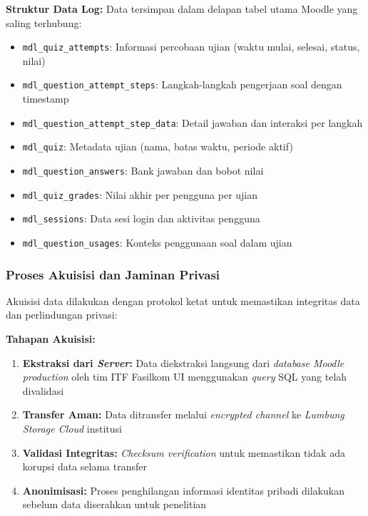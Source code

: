 \textbf{Struktur Data Log:}
Data tersimpan dalam delapan tabel utama Moodle yang saling terhubung:
\begin{itemize}
    \item \texttt{mdl\_quiz\_attempts}: Informasi percobaan ujian (waktu mulai, selesai, status, nilai)
    \item \texttt{mdl\_question\_attempt\_steps}: Langkah-langkah pengerjaan soal dengan timestamp
    \item \texttt{mdl\_question\_attempt\_step\_data}: Detail jawaban dan interaksi per langkah
    \item \texttt{mdl\_quiz}: Metadata ujian (nama, batas waktu, periode aktif)
    \item \texttt{mdl\_question\_answers}: Bank jawaban dan bobot nilai
    \item \texttt{mdl\_quiz\_grades}: Nilai akhir per pengguna per ujian
    \item \texttt{mdl\_sessions}: Data sesi login dan aktivitas pengguna
    \item \texttt{mdl\_question\_usages}: Konteks penggunaan soal dalam ujian
\end{itemize}

\subsubsection{Proses Akuisisi dan Jaminan Privasi}
\label{sec:prosesAkuisisiPrivasi}

Akuisisi data dilakukan dengan protokol ketat untuk memastikan integritas data dan perlindungan privasi:

\textbf{Tahapan Akuisisi:}
\begin{enumerate}
    \item \textbf{Ekstraksi dari \textit{Server}:} Data diekstraksi langsung dari \textit{database Moodle production} oleh tim ITF Fasilkom UI menggunakan \textit{query} SQL yang telah divalidasi
    \item \textbf{Transfer Aman:} Data ditransfer melalui \textit{encrypted channel} ke \textit{Lumbung Storage Cloud} institusi
    \item \textbf{Validasi Integritas:} \textit{Checksum verification} untuk memastikan tidak ada korupsi data selama transfer
    \item \textbf{Anonimisasi:} Proses penghilangan informasi identitas pribadi dilakukan sebelum data diserahkan untuk penelitian
\end{enumerate}

